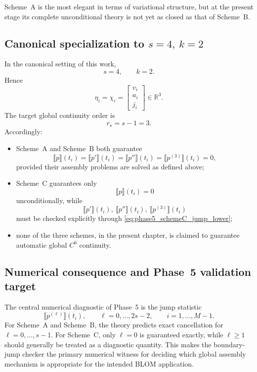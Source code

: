 Scheme~A is the most elegant in terms of variational structure, but at the present stage its complete unconditional theory is not yet as closed as that of Scheme~B.

\subsection{Canonical specialization to \texorpdfstring{$s=4,\ k=2$}{s=4,k=2}}
\label{subsec:phase5_canonical_s4k2}

In the canonical setting of this work,
\[
s=4,\qquad k=2.
\]
Hence
\[
\eta_i=\chi_i=
\begin{bmatrix}
v_i\\ a_i\\ j_i
\end{bmatrix}\in\mathbb R^3.
\]
The target global continuity order is
\[
r_\star=s-1=3.
\]
Accordingly:
\begin{itemize}
    \item Scheme~A and Scheme~B both guarantee
    \[
    \llbracket p\rrbracket(t_i)=
    \llbracket p'\rrbracket(t_i)=
    \llbracket p''\rrbracket(t_i)=
    \llbracket p^{(3)}\rrbracket(t_i)=0,
    \]
    provided their assembly problems are solved as defined above;
    \item Scheme~C guarantees only
    \[
    \llbracket p\rrbracket(t_i)=0
    \]
    unconditionally, while
    \[
    \llbracket p'\rrbracket(t_i),\ 
    \llbracket p''\rrbracket(t_i),\ 
    \llbracket p^{(3)}\rrbracket(t_i)
    \]
    must be checked explicitly through \eqref{eq:phase5_schemeC_jump_lower};
    \item none of the three schemes, in the present chapter, is claimed to guarantee automatic global \(C^6\) continuity.
\end{itemize}

\subsection{Numerical consequence and Phase~5 validation target}
\label{subsec:phase5_validation_target}

The central numerical diagnostic of Phase~5 is the jump statistic
\[
\llbracket p^{(\ell)}\rrbracket(t_i),
\qquad
\ell=0,\dots,2s-2,
\qquad
i=1,\dots,M-1.
\]
For Scheme~A and Scheme~B, the theory predicts exact cancellation for \(\ell=0,\dots,s-1\).
For Scheme~C, only \(\ell=0\) is guaranteed exactly, while \(\ell\ge 1\) should generally be treated as a diagnostic quantity.
This makes the boundary-jump checker the primary numerical witness for deciding which global assembly mechanism is appropriate for the intended BLOM application.